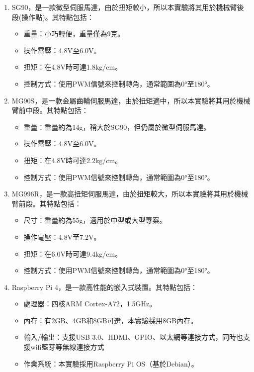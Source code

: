 \documentclass[class=NCU_thesis, crop=false]{standalone}
\begin{document}
\begin{enumerate}
\item SG90，是一款微型伺服馬達，由於扭矩較小，所以本實驗將其用於機械臂後段(操作點)。其特點包括：
\begin{itemize}
    \item 重量：小巧輕便，重量僅為9克。
    \item 操作電壓：4.8V至6.0V。
    \item 扭矩：在4.8V時可達1.8kg/cm。
    \item 控制方式：使用PWM信號來控制轉角，通常範圍為0°至180°。
\end{itemize}

\item MG90S，是一款金屬齒輪伺服馬達，由於扭矩適中，所以本實驗將其用於機械臂前中段。其特點包括：
\begin{itemize}
    \item 重量：重量約為14g，稍大於SG90，但仍屬於微型伺服馬達。
    \item 操作電壓：4.8V至6.0V。
    \item 扭矩：在4.8V時可達2.2kg/cm。
    \item 控制方式：使用PWM信號來控制轉角，通常範圍為0°至180°。
\end{itemize}

\item MG996R，是一款高扭矩伺服馬達，由於扭矩較大，所以本實驗將其用於機械臂前段。其特點包括：
\begin{itemize}
    \item 尺寸：重量約為55g，適用於中型或大型專案。
    \item 操作電壓：4.8V至7.2V。
    \item 扭矩：在6.0V時可達9.4kg/cm。
    \item 控制方式：使用PWM信號來控制轉角，通常範圍為0°至180°。
\end{itemize}

\item Raspberry Pi 4，是一款高性能的嵌入式裝置。其特點包括：
\begin{itemize}
    \item 處理器：四核ARM Cortex-A72，1.5GHz。
    \item 內存：有2GB、4GB和8GB可選，本實驗採用8GB內存。
    \item 輸入/輸出：支援USB 3.0、HDMI、GPIO、以太網等連接方式，同時也支援wifi藍芽等無線連接方式
    \item 作業系統：本實驗採用Raspberry Pi OS（基於Debian）。
\end{itemize}


\end{enumerate}
\end{document}
